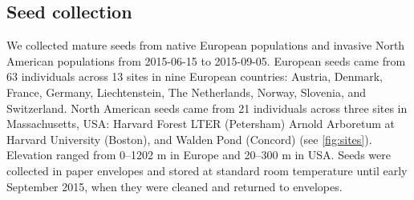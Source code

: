\documentclass[12pt]{article}\usepackage[]{graphicx}\usepackage[]{color}
\begin{document}
	\subsection{Seed collection} 
	We collected mature seeds from native European populations and invasive North American populations from 2015-06-15 to 2015-09-05. European seeds came from 63 individuals across 13 sites in nine European countries: Austria, Denmark, France, Germany, Liechtenstein, The Netherlands, Norway, Slovenia, and Switzerland.  North American seeds came from 21 individuals across three sites  in Massachusetts, USA: Harvard Forest LTER (Petersham) Arnold Arboretum at Harvard University (Boston), and Walden Pond (Concord) (see \ref{fig:sites}). Elevation ranged from 0--1202 m in Europe and 20--300 m in USA. Seeds were collected in paper envelopes and stored at standard room temperature until early September 2015, when they were cleaned and returned to envelopes.  %
	
	
\end{document}
